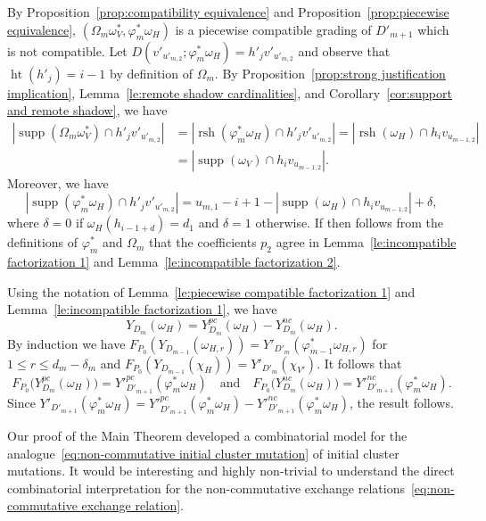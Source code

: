 \documentclass[ALCO,ThmDefs,Unicode,epreuves]{cedram}
\DeclareMathOperator{\hgt}{ht}
\DeclareMathOperator{\supp}{supp}
\DeclareMathOperator{\rsh}{rsh}
\begin{document}
\begin{enumerate}[label=(\alph*)]
 By Proposition~\ref{prop:compatibility equivalence} and Proposition~\ref{prop:piecewise equivalence}, $(\Omega_m\omega^*_V,\varphi^*_m\omega_H)$ is a piecewise compatible grading of $D'_{m+1}$ which is not compatible.
 Let $D(v'_{u'_{m,2}};\varphi^*_m\omega_H)=h'_jv'_{u'_{m,2}}$ and observe that $\hgt(h'_j)=i-1$ by definition of $\Omega_m$.
 By Proposition~\ref{prop:strong justification implication}, Lemma~\ref{le:remote shadow cardinalities}, and Corollary~\ref{cor:support and remote shadow}, we have
 \begin{align*}
 |\supp(\Omega_m\omega^*_V)\cap h'_jv'_{u'_{m,2}}|&=|\rsh(\varphi^*_m\omega_H)\cap h'_jv'_{u'_{m,2}}|=|\rsh(\omega_H)\cap h_iv_{u_{m-1,2}}|\\
 &=|\supp(\omega_V)\cap h_iv_{u_{m-1,2}}|.
 \end{align*}
 Moreover, we have
 \[|\supp(\varphi^*_m\omega_H)\cap h'_jv'_{u'_{m,2}}|=u_{m,1}-i+1-|\supp(\omega_H)\cap h_iv_{u_{m-1,2}}|+\delta,\]
 where $\delta=0$ if $\omega_H(h_{i-1+d})=d_1$ and $\delta=1$ otherwise.
 If then follows from the definitions of $\varphi^*_m$ and $\Omega_m$ that the coefficients $p_2$ agree in Lemma~\ref{le:incompatible factorization 1} and Lemma~\ref{le:incompatible factorization 2}.

 Using the notation of Lemma~\ref{le:piecewise compatible factorization 1} and Lemma~\ref{le:incompatible factorization 1}, we have 
 \[
 Y_{D_m}(\omega_H)=Y_{D_m}^{pc}(\omega_H)-Y_{D_m}^{nc}(\omega_H).
 \]
 By induction we have $F_{P_0}(Y_{D_{m-1}}(\omega_{H,r}))=Y'_{D'_m}(\varphi^*_{m-1}\omega_{H,r})$ for $1\le r\le d_m-\delta_m$ and $F_{P_0}(Y_{D_{m-1}}(\chi_H))=Y'_{D'_m}(\chi_{V'})$.
 It follows that 
 \[
 F_{P_0}\big(Y_{D_m}^{pc}(\omega_H)\big)={Y'}_{D'_{m+1}}^{pc}(\varphi^*_m\omega_H) 
 \quad\text{and} \quad F_{P_0}\big(Y_{D_m}^{nc}(\omega_H)\big)={Y'}_{D'_{m+1}}^{nc}(\varphi^*_m\omega_H).
 \]
 Since $Y'_{D'_{m+1}}(\varphi^*_m\omega_H)={Y'}_{D'_{m+1}}^{pc}(\varphi^*_m\omega_H)-{Y'}_{D'_{m+1}}^{nc}(\varphi^*_m\omega_H)$, the result follows.
\end{enumerate}

\begin{remark}
 Our proof of the Main Theorem developed a combinatorial model for the analogue~\eqref{eq:non-commutative initial cluster mutation} of initial cluster mutations.
 It would be interesting and highly non-trivial to understand the direct combinatorial interpretation for the non-commutative exchange relations~\eqref{eq:non-commutative exchange relation}.
\end{remark}
\end{document}

